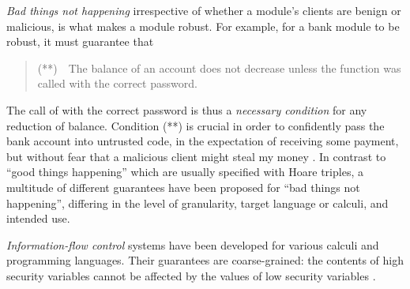   \vspace{.03in}
\emph{Bad things not happening}
   irrespective of whether a module's clients are benign or malicious, is what makes a module  robust. 
{For example}, for a bank module to 
be robust, it must 
guarantee  that
\begin{quote}
(**)\  \ The balance of an account does not decrease unless the  function was called with the  correct password.
\end{quote}
The call of   with the  correct password is thus
a \emph{necessary condition} for any reduction of  balance.
 Condition   
(**) is crucial in order to confidently pass the bank account into untrusted code, 
in the expectation of receiving some payment, but without fear
that a malicious client might steal my money \cite{ELang,miller-esop2013}.
%
In contrast to ``good things   happening''  which are usually specified with %
Hoare triples,  a multitude of different guarantees have been proposed for ``bad things  not
happening'', differing in the level 
of granularity,   target  language or calculi, and intended use.

 
 

\emph{Information-flow control}  systems have been developed for
various calculi and programming languages. Their 
 guarantees are coarse-grained:  the contents of high security variables cannot
be affected by the values of low security variables 
\cite{Zdancewic:Myers:01,noninteferenceOS}. 
 
